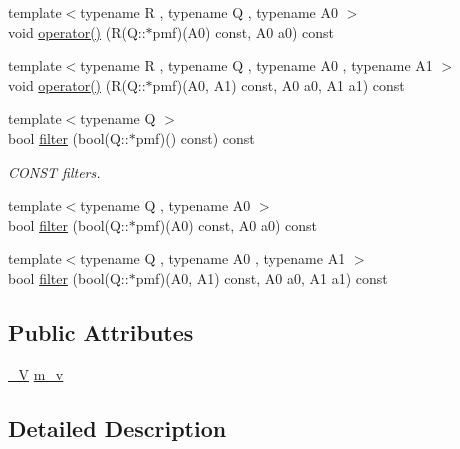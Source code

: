 \begin{DoxyCompactItemize}
{\footnotesize template$<$typename R , typename Q , typename A0 $>$ }\\void \hyperlink{class_d_d4hep_1_1_simulation_1_1_geant4_action_1_1_actors_af26cd9a0b6f118db6ccebe32512bb121}{operator()} (R(Q\+::$\ast$pmf)(A0) const, A0 a0) const
\item 
{\footnotesize template$<$typename R , typename Q , typename A0 , typename A1 $>$ }\\void \hyperlink{class_d_d4hep_1_1_simulation_1_1_geant4_action_1_1_actors_add8decfc0e37bc4b84f8b86da56e5e19}{operator()} (R(Q\+::$\ast$pmf)(A0, A1) const, A0 a0, A1 a1) const
\item 
{\footnotesize template$<$typename Q $>$ }\\bool \hyperlink{class_d_d4hep_1_1_simulation_1_1_geant4_action_1_1_actors_a33038ce776dcdbdc1629acf9e989b68b}{filter} (bool(Q\+::$\ast$pmf)() const) const
\begin{DoxyCompactList}\small\item\em C\+O\+N\+ST filters. \end{DoxyCompactList}\item 
{\footnotesize template$<$typename Q , typename A0 $>$ }\\bool \hyperlink{class_d_d4hep_1_1_simulation_1_1_geant4_action_1_1_actors_a3c8c401d4e25a2dbb05650688a904f46}{filter} (bool(Q\+::$\ast$pmf)(A0) const, A0 a0) const
\item 
{\footnotesize template$<$typename Q , typename A0 , typename A1 $>$ }\\bool \hyperlink{class_d_d4hep_1_1_simulation_1_1_geant4_action_1_1_actors_a572356a2f816bfbacf017978236730f0}{filter} (bool(Q\+::$\ast$pmf)(A0, A1) const, A0 a0, A1 a1) const
\end{DoxyCompactItemize}
\subsection*{Public Attributes}
\begin{DoxyCompactItemize}
\item 
\hyperlink{class_d_d4hep_1_1_simulation_1_1_geant4_action_1_1_actors_a18b6dfb1542a2cd036d8317db48f6c16}{\+\_\+V} \hyperlink{class_d_d4hep_1_1_simulation_1_1_geant4_action_1_1_actors_a9b46bb7156ab383291efa066fc23ce7d}{m\+\_\+v}
\end{DoxyCompactItemize}


\subsection{Detailed Description}

